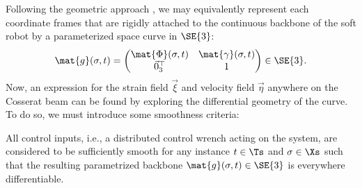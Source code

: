 Following the geometric approach \cite{Simo1986,Boyer2010,Boyer2021,Renda2018,Renda2020}, we may equivalently represent each coordinate frames that are rigidly attached to the continuous backbone of the soft robot by a parameterized space curve in $\SE{3}$:
%
\begin{equation}
\mat{g}(\sigma,t) = \begin{pmatrix} \mat{\Phi}(\sigma,t) & \mat{\gamma}(\sigma,t) \\ \vec{0}_3^\top & 1 \end{pmatrix} \in \SE{3}.
\end{equation}
%
Now, an expression for the strain field $\vec{\xi}$ and velocity field $\vec{\eta}$ anywhere on the Cosserat beam can be found by exploring the differential geometry of the curve. To do so, we must introduce some smoothness criteria:
%
\begin{asm}
\label{assum:1}
All control inputs, i.e., a distributed control wrench acting on the system, are considered to be sufficiently smooth for any instance $t \in \Ts$ and $\sigma \in \Xs$ such that the resulting parametrized backbone $\mat{g}(\sigma,t) \in \SE{3}$ is everywhere differentiable.
\end{asm}

